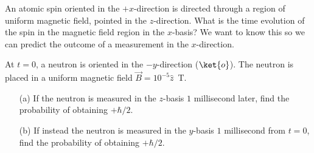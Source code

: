 \begin{exercise}
An atomic spin oriented in the $+x$-direction is directed through a region of uniform magnetic field, pointed in the $z$-direction. What is the time evolution of the spin in the magnetic field region in the $x$-basis? We want to know this so we can predict the outcome of a measurement in the $x$-direction.
\end{exercise}

\begin{exercise}
  At $t = 0$, a neutron is oriented in the $-y$-direction ($\ket{o}$). The neutron is placed in a uniform magnetic field $\vec{B} = 10^{-5}\hat{z}$~T. 
  
\begin{enumerate}
\item[(a)]  If the neutron is measured in the $z$-basis $1$ millisecond later, find the probability of obtaining $+\hbar/2$.
\item[(b)]  If  instead the neutron is measured in the $y$-basis $1$ millisecond from $t=0$, find the probability of obtaining $+\hbar/2$.
\end{enumerate}

\end{exercise}

